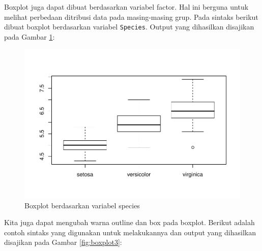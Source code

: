 \documentclass[]{book}
\newenvironment{Shaded}{\begin{snugshade}}{\end{snugshade}}
\newcommand{\KeywordTok}[1]{\textcolor[rgb]{0.13,0.29,0.53}{\textbf{#1}}}
\newcommand{\DataTypeTok}[1]{\textcolor[rgb]{0.13,0.29,0.53}{#1}}
\newcommand{\StringTok}[1]{\textcolor[rgb]{0.31,0.60,0.02}{#1}}
\newcommand{\CommentTok}[1]{\textcolor[rgb]{0.56,0.35,0.01}{\textit{#1}}}
\newcommand{\OperatorTok}[1]{\textcolor[rgb]{0.81,0.36,0.00}{\textbf{#1}}}
\newcommand{\NormalTok}[1]{#1}
\begin{document}
Boxplot juga dapat dibuat berdasarkan variabel factor. Hal ini berguna
untuk melihat perbedaan ditribusi data pada masing-masing grup. Pada
sintaks berikut dibuat boxplot berdasarkan variabel \texttt{Species}.
Output yang dihasilkan disajikan pada Gambar \ref{fig:boxplot2}:

\begin{Shaded}
\end{Shaded}

\begin{figure}

{\centering \includegraphics[width=0.7\linewidth]{EnvStat_files/figure-latex/boxplot2-1} 

}

\caption{Boxplot berdasarkan variabel species}\label{fig:boxplot2}
\end{figure}

Kita juga dapat mengubah warna outline dan box pada boxplot. Berikut
adalah contoh sintaks yang digunakan untuk melakukannya dan output yang
dihasilkan disajikan pada Gambar \ref{fig:boxplot3}:

\begin{Shaded}
\end{Shaded}
\end{document}
